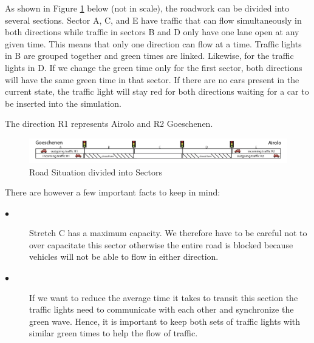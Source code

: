 \documentclass[11pt,a4paper,parskip=half-]{article}
\begin{document}
As shown in Figure \ref{fig:Traffic_Situation} below (not in scale), the roadwork can be divided into several sections. Sector A, C, and E have traffic that can flow simultaneously in both directions while traffic in sectors B and D only have one lane open at any given time. This means that only one direction can flow at a time. Traffic lights in B are grouped together and green times are linked. Likewise, for the traffic lights in D. If we change the green time only for the first sector, both directions will have the same green time in that sector. If there are no cars present in the current state, the traffic light will stay red for both directions waiting for a car to be inserted into the simulation.   

\vspace {1mm}

The direction R1 represents Airolo and R2 Goeschenen. 

\begin{figure}[h!]
\includegraphics[scale=0.85]{Traffic_Situation}
\centering
\vspace*{-8mm}
\caption{Road Situation divided into Sectors}
\label{fig:Traffic_Situation}
\end{figure}

\vspace{3mm}


There are however a few important facts to keep in mind:

\begin{description}
  
  \item[$\bullet$ ] Stretch C has a maximum capacity. We therefore have to be careful not to over capacitate this sector otherwise the entire road is blocked because vehicles will not be able to flow in either direction. 
  
  \item[$\bullet$ ] If we want to reduce the average time it takes to transit this section the traffic lights need to communicate with each other and synchronize the green wave. Hence, it is important to keep both sets of traffic lights with similar green times to help the flow of traffic. 
   
\end{description}
\end{document}
